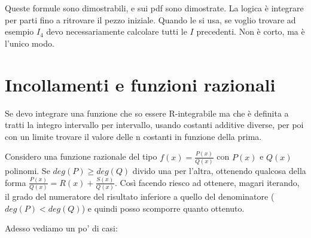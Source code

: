 \documentclass{article}
\theoremstyle{definition}
\theoremstyle{definition}
\theoremstyle{definition}
\theoremstyle{definition}
\theoremstyle{definition}
\begin{document}
Queste formule sono dimostrabili, e sui pdf sono dimostrate. La logica è integrare per parti fino a ritrovare il pezzo iniziale. Quando le si usa, se voglio trovare ad esempio $I_4$ devo necessariamente calcolare tutti le $I$ precedenti. Non è corto, ma è l'unico modo.

\newpage
\section{Incollamenti e funzioni razionali}

Se devo integrare una funzione che so essere R-integrabile ma che è definita a tratti la integro intervallo per intervallo, usando costanti additive diverse, per poi con un limite trovare il valore delle n costanti in funzione della prima.

\vspace{3mm}

Considero una funzione razionale del tipo $\displaystyle{f(x)=\frac{P(x)}{Q(x)}}$ con $P(x)$ e $Q(x)$ polinomi. Se $deg(P)\geq deg(Q)$ divido una per l'altra, ottenendo qualcosa della forma $\displaystyle{\frac{P(x)}{Q(x)}=R(x)+\frac{S(x)}{Q(x)}}$. Così facendo riesco ad ottenere, magari iterando, il grado del numeratore del risultato inferiore a quello del denominatore ($deg(P)<deg(Q)$) e quindi posso scomporre quanto ottenuto.

\vspace{3mm}

Adesso vediamo un po' di casi:
\end{document}
